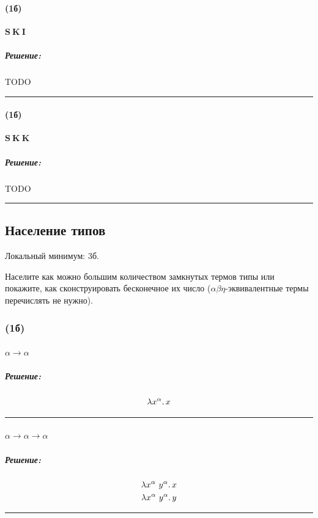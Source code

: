 \documentclass{article}
\newenvironment{proof}{\subparagraph{\hspace{-1em}Решение:\newline}}{\par\noindent\rule{\textwidth}{0.4pt}}
\newcommand{\term}[1]{\mathbf{#1}}
\newcommand{\ap}{~}
\begin{document}
    \paragraph{(1б)} $\term{S} \ap \term{K} \ap \term{I}$

    \begin{proof}
        TODO %
    \end{proof}

    \paragraph{(1б)} $\term{S} \ap \term{K} \ap \term{K}$

    \begin{proof}
        TODO %
    \end{proof}

    \subsection{Население типов}

    Локальный минимум: 3б.

    Населите как можно большим количеством замкнутых термов типы или покажите, как
    сконструировать бесконечное их число ($\alpha\beta\eta$-эквивалентные
    термы перечислять не нужно).

    \subsubsection{(1б)}

    \paragraph{} $\alpha \to \alpha$

    \begin{proof}
        \[
            \lambda x^\alpha\ldotp x
        \]
    \end{proof}

    \paragraph{} $\alpha \to \alpha \to \alpha$

    \begin{proof}
        \begin{gather*}
            \lambda x^\alpha~y^\alpha\ldotp x\\
            \lambda x^\alpha~y^\alpha\ldotp y
        \end{gather*}
    \end{proof}
\end{document}
